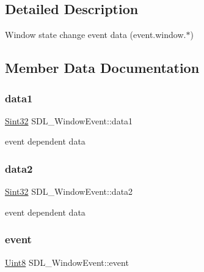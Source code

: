 \subsection{Detailed Description}
Window state change event data (event.\+window.$\ast$) 

\subsection{Member Data Documentation}
\mbox{\label{struct_s_d_l___window_event_a01da0025428d3434c80021f3e4089fec}} 
\subsubsection{\texorpdfstring{data1}{data1}}
{\footnotesize\ttfamily \mbox{\hyperlink{_s_d_l__stdinc_8h_a7a90b941db9d4582e9ad7abb9940ff7e}{Sint32}} S\+D\+L\+\_\+\+Window\+Event\+::data1}

event dependent data \mbox{\label{struct_s_d_l___window_event_af6cd0a21bc9ecadfee42f6a0147d7171}} 
\subsubsection{\texorpdfstring{data2}{data2}}
{\footnotesize\ttfamily \mbox{\hyperlink{_s_d_l__stdinc_8h_a7a90b941db9d4582e9ad7abb9940ff7e}{Sint32}} S\+D\+L\+\_\+\+Window\+Event\+::data2}

event dependent data \mbox{\label{struct_s_d_l___window_event_a485cd1f07f0f22fdb9f4c4bf214011dc}} 
\subsubsection{\texorpdfstring{event}{event}}
{\footnotesize\ttfamily \mbox{\hyperlink{_s_d_l__stdinc_8h_a2944638813a090aa23e62f4da842c3e2}{Uint8}} S\+D\+L\+\_\+\+Window\+Event\+::event}

